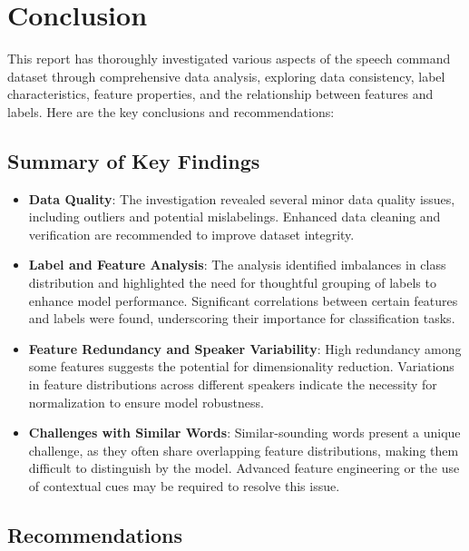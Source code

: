 \section{Conclusion}

This report has thoroughly investigated various aspects of the speech command dataset through comprehensive data analysis, exploring data consistency, label characteristics, feature properties, and the relationship between features and labels. Here are the key conclusions and recommendations:

\subsection{Summary of Key Findings}

\begin{itemize}
    \item \textbf{Data Quality}:
    The investigation revealed several minor data quality issues,
    including outliers and potential mislabelings. Enhanced data cleaning and verification
    are recommended to improve dataset integrity.
    \item \textbf{Label and Feature Analysis}:
    The analysis identified imbalances in class distribution and highlighted the need
    for thoughtful grouping of labels to enhance model performance.
    Significant correlations between certain features and labels were found,
    underscoring their importance for classification tasks.
    \item \textbf{Feature Redundancy and Speaker Variability}:
    High redundancy among some features suggests the potential for dimensionality reduction.
    Variations in feature distributions across different speakers indicate the necessity for
    normalization to ensure model robustness.
    \item \textbf{Challenges with Similar Words}:
    Similar-sounding words present a unique challenge, as they often share
    overlapping feature distributions, making them difficult to distinguish by the model.
    Advanced feature engineering or the use of contextual cues may be required to resolve this issue.
\end{itemize}

\subsection{Recommendations}

